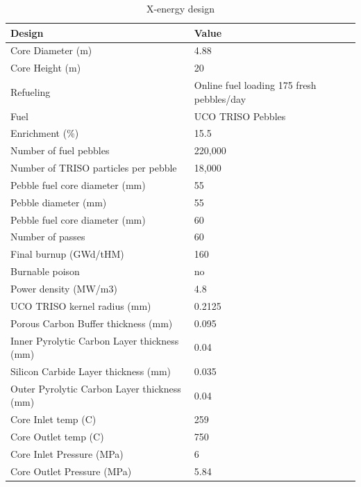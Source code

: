 \documentclass[10pt,a4paper]{article}
\begin{document}
\begin{table} [ht]
\begin{center}

\caption{ X-energy design}
\label{xtable}
\begin{tabular}{|l|l|}
\hline 
Design 		&Value \\ 
\hline 
Core Diameter (m) 		&4.88 \\ 
\hline 
Core Height (m) 		&20 \\ 
\hline 
Refueling		&Online fuel loading 
175 fresh pebbles/day \\ 
\hline 
Fuel		&UCO TRISO Pebbles \\ 
\hline 
Enrichment (\%)		&15.5 \\ 
\hline 
Number of fuel pebbles		&220,000 \\ 
\hline 
Number of TRISO particles per pebble		&18,000 \\ 
\hline 
Pebble fuel core diameter (mm)		&55 \\ 
\hline 
Pebble diameter (mm)	&55 \\ 
\hline 
Pebble fuel core diameter (mm)		&60 \\ 
\hline 
Number of passes		&60\\ 
\hline 
Final burnup (GWd/tHM)		&160 \\ 
\hline 
Burnable poison		&no \\ 
\hline 
Power density (MW/m3)		&4.8 \\ 
\hline 
UCO TRISO kernel radius (mm)	&0.2125 \\ 
\hline 
Porous Carbon Buffer thickness (mm)	&0.095 \\ 
\hline 
Inner Pyrolytic Carbon Layer thickness (mm) 	&0.04 \\ 
\hline 
Silicon Carbide Layer thickness (mm)	&0.035 \\ 
\hline 
Outer Pyrolytic Carbon Layer thickness (mm)	&0.04 \\ 
\hline 
Core Inlet temp (C)	&259 \\ 
\hline 
Core Outlet temp (C) 	&750 \\ 
\hline 
Core Inlet Pressure (MPa)	&6 \\ 
\hline 
Core Outlet Pressure (MPa)	&5.84 \\ 
\hline 

\end{tabular}
\end{center}
\end{table}
\end{document}
